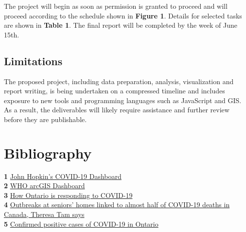 \documentclass{article}
\begin{document}
The project will begin as soon as permission is granted to proceed and will proceed according to the schedule shown in \textbf{Figure 1}. Details for selected tasks are shown in \textbf{Table 1}. The final report will be completed by the week of June 15th.


\subsection{Limitations}

The proposed project, including data preparation, analysis, visualization and report writing, is being undertaken on a compressed timeline and includes exposure to new tools and programming languages such as JavaScript and GIS. As a result, the deliverables will likely require assistance and further review before they are publishable.
 


\section{Bibliography}

\textbf{1} \href{https://www.arcgis.com/apps/opsdashboard/index.html#/bda7594740fd40299423467b48e9ecf6}{John Hopkin's COVID-19 Dashboard}\\

\textbf{2} \href{https://www.arcgis.com/apps/opsdashboard/index.html#/bda7594740fd40299423467b48e9ecf6}{WHO arcGIS Dashboard}\\

\textbf{3} \href{https://www.ontario.ca/page/how-ontario-is-responding-covid-19}{How Ontario is responding to COVID-19}\\

\textbf{4} \href{https://www.theglobeandmail.com/canada/article-outbreaks-at-seniors-homes-linked-to-almost-half-of-covid-19-deaths/}{Outbreaks at seniors’ homes linked to almost half of COVID-19 deaths in Canada, Theresa Tam says}\\

\textbf{5} \href{https://data.ontario.ca/dataset/confirmed-positive-cases-of-covid-19-in-ontario/resource/455fd63b-603d-4608-8216-7d8647f43350}{Confirmed positive cases of COVID-19 in Ontario}






\end{document}
